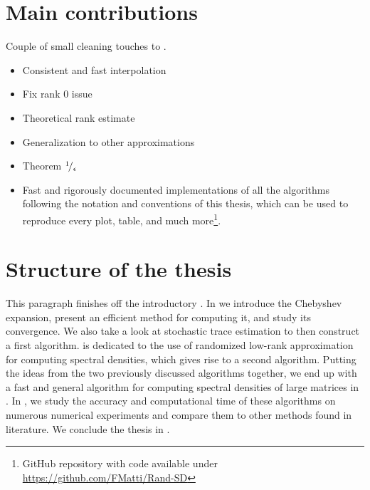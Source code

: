 \section{Main contributions}
\label{sec:1-introduction-contributions}

Couple of small cleaning touches to \cite{lin2017randomized}.%

\begin{itemize}
    \item Consistent and fast interpolation
    \item Fix rank 0 issue
    \item Theoretical rank estimate
    \item Generalization to other approximations
    \item Theorem ${}^{1}\!/_{\epsilon}$
    \item Fast and rigorously documented implementations of all the algorithms
          following the notation and conventions of this thesis, which can be used to
          reproduce every plot, table, and much more\footnote{GitHub repository with
          code available under \url{https://github.com/FMatti/Rand-SD}}.
\end{itemize}


\section{Structure of the thesis}
\label{sec:1-introduction-structure}

This paragraph finishes off the introductory .
In  we introduce the Chebyshev expansion, present an
efficient method for computing it, and study its convergence. We also take a
look at stochastic trace estimation to then construct a first algorithm.
 is dedicated to the use of randomized low-rank approximation
for computing spectral densities, which gives rise to a second algorithm.
Putting the ideas from the two previously discussed algorithms together,
we end up with a fast and general algorithm for computing spectral densities
of large matrices in . In ,
we study the accuracy and computational time of these algorithms on numerous
numerical experiments and compare them to other methods found in literature.
We conclude the thesis in .

